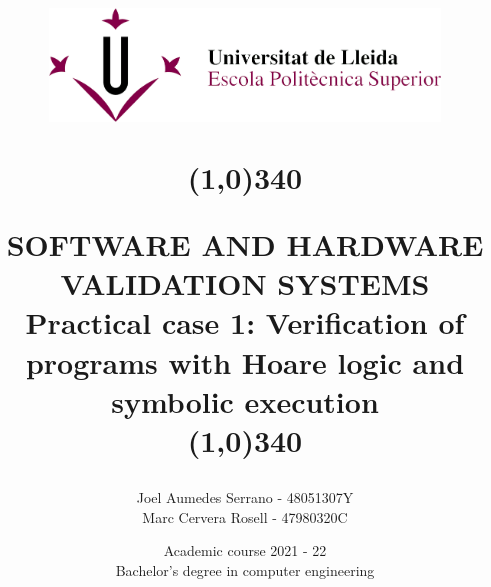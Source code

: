 \title{
	\begin{center}
	\vspace{3cm}
	\includegraphics[width=11cm, height=3cm]{images/logo_eps.png}
	\end{center}
	\begin{center}
	\line(1,0){340}
	\end{center}		
	SOFTWARE AND HARDWARE VALIDATION SYSTEMS\\
	\vspace{2mm}
	\Large Practical case 1: Verification of programs with Hoare logic and symbolic execution\\
	\line(1,0){340}
	\vspace{1.5cm}
	}

\author{Joel Aumedes Serrano - 48051307Y \\ Marc Cervera Rosell - 47980320C \vspace{1cm}}


\date{Academic course 2021 - 22\vspace{0.5cm} \\Bachelor's degree in computer engineering}